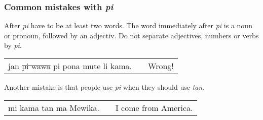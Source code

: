 % 
\label{'mistakes_with_pi'}
\subsubsection*{Common mistakes with \textit{pi}}
%
After \textit{pi} have to be at least two words. 
The word immediately after \textit{pi} is a noun or pronoun, followed by an adjectiv.
Do not separate adjectives, numbers or verbs by \textit{pi}.

\begin{supertabular}{p{5,5cm}|ll}
jan \sout{pi wawa} pi pona mute li kama. && Wrong! \\ %
\end{supertabular}

%
%
%
%
%
Another mistake is that people use \textit{pi} when they should use \textit{tan}. 

\begin{supertabular}{p{5,5cm}|ll}
mi kama tan ma Mewika. && I come from America. \\
\end{supertabular}  

